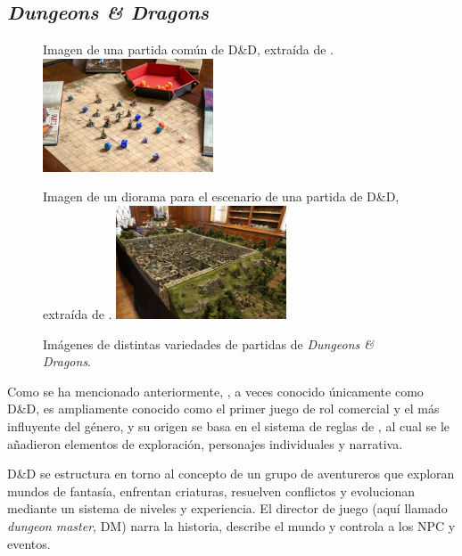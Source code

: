 \subsection{\textit{Dungeons \& Dragons}}
\begin{figure}[t]
\centering
\begin{SubFloat}
{\label{fig:dndsencillo}%
	Imagen de una partida común de D\&D, extraída de \cite{dndsencillaimg}.}%
	\includegraphics[width=0.45\textwidth]{Imagenes/Vectorial/dndsencillo}%
\end{SubFloat}
\qquad
\begin{SubFloat}
{\label{fig:dnddiorama}%
	Imagen de un diorama para el escenario de una partida de D\&D, extraída de \cite{dnddioramaimg}.}%
	\includegraphics[width=0.45\textwidth]{Imagenes/Vectorial/dnddiorama}%
\end{SubFloat}
\caption{Imágenes de distintas variedades de partidas de \textit{Dungeons \& Dragons}. \label{fig:dndejemplos}}
\end{figure}

Como se ha mencionado anteriormente, \cite{ogdnd}, a veces conocido únicamente como D\&D, es ampliamente conocido como el primer juego de rol comercial y el más influyente del género, y su origen se basa en el sistema de reglas de \cite{chainmail}, al cual se le añadieron elementos de exploración, personajes individuales y narrativa.

\medskip

D\&D se estructura en torno al concepto de un grupo de aventureros que exploran mundos de fantasía, enfrentan criaturas, resuelven conflictos y evolucionan mediante un sistema de niveles y experiencia. El director de juego (aquí llamado \textit{dungeon master}, DM) narra la historia, describe el mundo y controla a los NPC y eventos.

